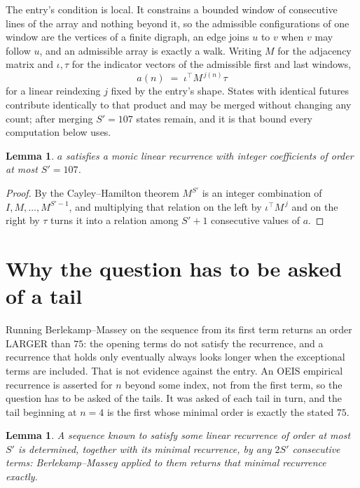\documentclass[11pt,a4paper]{article}
\theoremstyle{plain}
\newtheorem{lemma}[theorem]{Lemma}
\theoremstyle{definition}
\begin{document}
The entry's condition is local. It constrains a bounded window of consecutive lines of the
array and nothing beyond it, so the admissible configurations of one window are the vertices of
a finite digraph, an edge joins $u$ to $v$ when $v$ may follow $u$, and an admissible array is
exactly a walk. Writing $M$ for the adjacency matrix and $\iota,\tau$ for the indicator vectors
of the admissible first and last windows,
\[
a(n)\;=\;\iota^{\!\top}M^{\,j(n)}\tau
\]
for a linear reindexing $j$ fixed by the entry's shape. States with identical futures
contribute identically to that product and may be merged without changing any count; after
merging $S'=107$ states remain, and it is that bound every computation below uses.

\begin{lemma}\label{lem:cf}
$a$ satisfies a monic linear recurrence with integer coefficients of order at most $S'=107$.
\end{lemma}

\begin{proof}
By the Cayley--Hamilton theorem $M^{S'}$ is an integer combination of $I,M,\dots,M^{S'-1}$,
and multiplying that relation on the left by $\iota^{\!\top}M^{\,j}$ and on the right by
$\tau$ turns it into a relation among $S'+1$ consecutive values of $a$.
\end{proof}

\section{Why the question has to be asked of a tail}

Running Berlekamp--Massey on the sequence from its first term returns an order LARGER than $75$: the opening terms do not satisfy the recurrence, and a recurrence that holds only eventually always looks longer when the exceptional terms are included. That is not evidence against the entry. An OEIS empirical recurrence is asserted for $n$ beyond some index, not from the first term, so the question has to be asked of the tails. It was asked of each tail in turn, and the tail beginning at $n=4$ is the first whose minimal order is exactly the stated $75$.

\begin{lemma}\label{lem:bm}
A sequence known to satisfy some linear recurrence of order at most $S'$ is determined,
together with its minimal recurrence, by any $2S'$ consecutive terms: Berlekamp--Massey applied
to them returns that minimal recurrence exactly.
\end{lemma}
\end{document}
